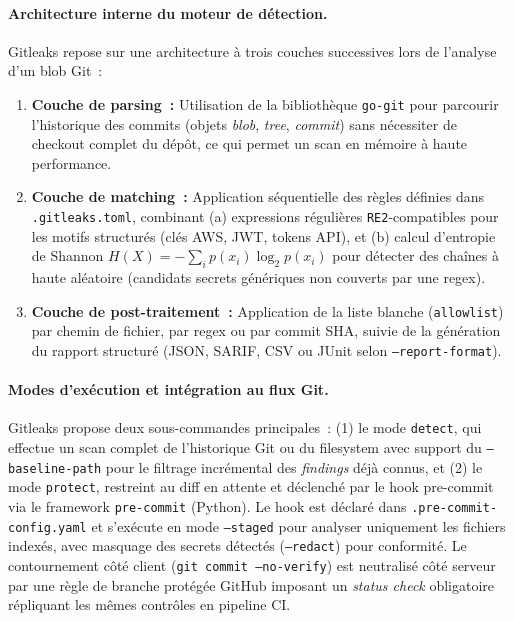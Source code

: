 \paragraph{Architecture interne du moteur de détection.}
Gitleaks repose sur une architecture à trois couches successives lors de l'analyse d'un blob Git~:
\begin{enumerate}
    \item \textbf{Couche de parsing~:} Utilisation de la bibliothèque \texttt{go-git} pour parcourir l'historique des commits (objets \textit{blob}, \textit{tree}, \textit{commit}) sans nécessiter de checkout complet du dépôt, ce qui permet un scan en mémoire à haute performance.
    \item \textbf{Couche de matching~:} Application séquentielle des règles définies dans \texttt{.gitleaks.toml}, combinant (a) expressions régulières \texttt{RE2}-compatibles pour les motifs structurés (clés AWS, JWT, tokens API), et (b) calcul d'entropie de Shannon $H(X) = -\sum_{i} p(x_i) \log_2 p(x_i)$ pour détecter des chaînes à haute aléatoire (candidats secrets génériques non couverts par une regex).
    \item \textbf{Couche de post-traitement~:} Application de la liste blanche (\texttt{allowlist}) par chemin de fichier, par regex ou par commit SHA, suivie de la génération du rapport structuré (JSON, SARIF, CSV ou JUnit selon \texttt{--report-format}).
\end{enumerate}

\paragraph{Modes d'exécution et intégration au flux Git.}
Gitleaks propose deux sous-commandes principales~: (1) le mode \texttt{detect}, qui effectue un scan complet de l'historique Git ou du filesystem avec support du \texttt{--baseline-path} pour le filtrage incrémental des \textit{findings} déjà connus, et (2) le mode \texttt{protect}, restreint au diff en attente et déclenché par le hook pre-commit via le framework \texttt{pre-commit} (Python). Le hook est déclaré dans \texttt{.pre-commit-config.yaml} et s'exécute en mode \texttt{--staged} pour analyser uniquement les fichiers indexés, avec masquage des secrets détectés (\texttt{--redact}) pour conformité. Le contournement côté client (\texttt{git commit --no-verify}) est neutralisé côté serveur par une règle de branche protégée GitHub imposant un \textit{status check} obligatoire répliquant les mêmes contrôles en pipeline CI.

